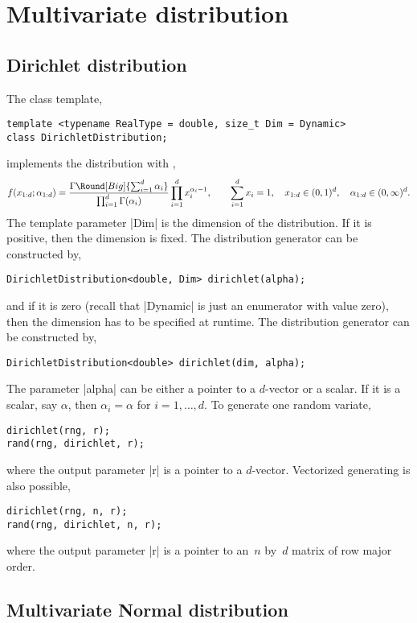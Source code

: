 \section{Multivariate distribution}
\label{sec:Multivariate distribution}

\subsection{Dirichlet distribution}
\label{sub:Dirichlet distribution}

The class template,
\begin{verbatim}
template <typename RealType = double, size_t Dim = Dynamic>
class DirichletDistribution;
\end{verbatim}
implements the distribution with \pdf,
\begin{equation*}
  f(x_{1:d};\alpha_{1:d}) =
  \frac{\Gamma\Round[Big]{\sum_{i=1}^d\alpha_i}}{\prod_{i=1}^d\Gamma(\alpha_i)}
  \prod_{i=1}^d x_i^{\alpha_i - 1},\qquad
  \sum_{i=1}^d x_i = 1,\quad
  x_{1:d}\in(0,1)^d,\quad
  \alpha_{1:d}\in(0,\infty)^d.
\end{equation*}
The template parameter |Dim| is the dimension of the distribution. If it is
positive, then the dimension is fixed. The distribution generator can be
constructed by,
\begin{verbatim}
DirichletDistribution<double, Dim> dirichlet(alpha);
\end{verbatim}
and if it is zero (recall that |Dynamic| is just an enumerator with value
zero), then the dimension has to be specified at runtime. The distribution
generator can be constructed by,
\begin{verbatim}
DirichletDistribution<double> dirichlet(dim, alpha);
\end{verbatim}
The parameter |alpha| can be either a pointer to a $d$-vector or a scalar. If
it is a scalar, say $\alpha$, then $\alpha_i = \alpha$ for $i = 1,\dots,d$. To
generate one random variate,
\begin{verbatim}
dirichlet(rng, r);
rand(rng, dirichlet, r);
\end{verbatim}
where the output parameter |r| is a pointer to a $d$-vector. Vectorized
generating is also possible,
\begin{verbatim}
dirichlet(rng, n, r);
rand(rng, dirichlet, n, r);
\end{verbatim}
where the output parameter |r| is a pointer to an~$n$ by~$d$ matrix of row
major order.

\subsection{Multivariate Normal distribution}
\label{sub:Multivariate Normal distribution}

